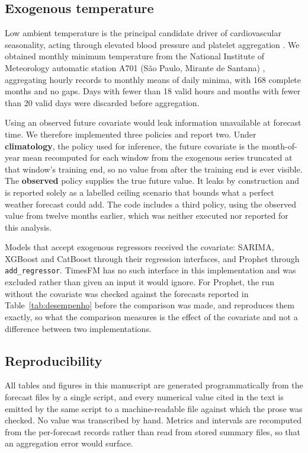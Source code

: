 \subsection{Exogenous temperature}

Low ambient temperature is the principal candidate driver of cardiovascular seasonality,
acting through elevated blood pressure and platelet aggregation \citep{analitis2008,
phung2016}. We obtained monthly minimum temperature from the National Institute of
Meteorology automatic station A701 (S\~ao Paulo, Mirante de Santana) \citep{inmet},
aggregating hourly records to monthly means of daily minima, with 168 complete months and
no gaps. Days with fewer than 18 valid hours and months with fewer than 20 valid days were
discarded before aggregation.

Using an observed future covariate would leak information unavailable at forecast time. We
therefore implemented three policies and report two. Under \textbf{climatology}, the policy
used for inference, the future covariate is the month-of-year mean recomputed for each
window from the exogenous series truncated at that window's training end, so no value from
after the training end is ever visible. The \textbf{observed} policy supplies the true
future value. It leaks by construction and is reported solely as a labelled ceiling scenario
that bounds what a perfect weather forecast could add. The code includes a third policy,
using the observed value from twelve months earlier, which was neither executed nor reported
for this analysis.

Models that accept exogenous regressors received the covariate: SARIMA, XGBoost and
CatBoost through their regression interfaces, and Prophet through
\texttt{add\_regressor}. TimesFM has no such interface in this implementation and was
excluded rather than given an input it would ignore. For Prophet, the run without the
covariate was checked against the forecasts reported in Table~\ref{tab:desempenho} before
the comparison was made, and reproduces them exactly, so what the comparison measures is
the effect of the covariate and not a difference between two implementations.

\subsection{Reproducibility}\label{sec:repro}

All tables and figures in this manuscript are generated programmatically from the forecast
files by a single script, and every numerical value cited in the text is emitted by the
same script to a machine-readable file against which the prose was checked. No value was
transcribed by hand. Metrics and intervals are recomputed from the per-forecast records
rather than read from stored summary files, so that an aggregation error would surface.

